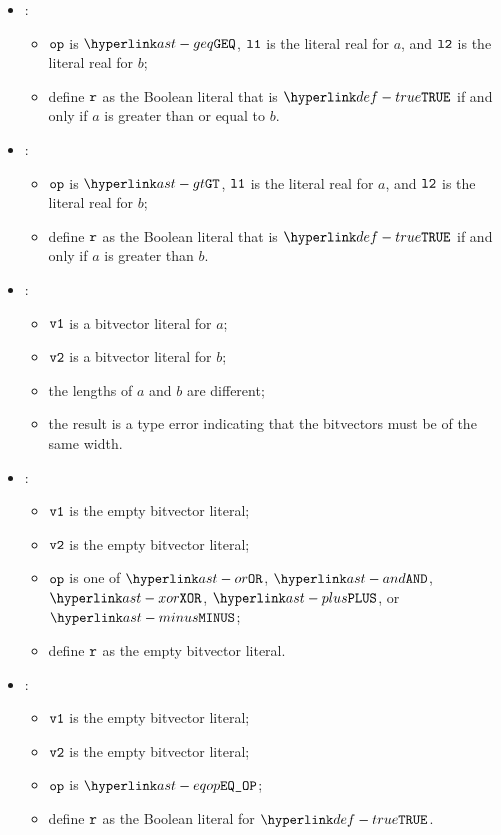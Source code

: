 \begin{itemize}
  \item {}:
  \begin{itemize}
    \item $\texttt{op}$ is $\GEQ$, $\texttt{l1}$ is the literal real for $a$, and $\texttt{l2}$ is the literal real for $b$;
    \item define $\texttt{r}$ as the Boolean literal that is $\True$ if and only if $a$ is greater than or equal to $b$.
  \end{itemize}

  \item {}:
  \begin{itemize}
    \item $\texttt{op}$ is $\GT$, $\texttt{l1}$ is the literal real for $a$, and $\texttt{l2}$ is the literal real for $b$;
    \item define $\texttt{r}$ as the Boolean literal that is $\True$ if and only if $a$ is greater than $b$.
  \end{itemize}

  \item {}:
  \begin{itemize}
    \item $\texttt{v1}$ is a bitvector literal for $a$;
    \item $\texttt{v2}$ is a bitvector literal for $b$;
    \item the lengths of $a$ and $b$ are different;
    \item the result is a type error indicating that the bitvectors must be of the same width.
  \end{itemize}

  \item {}:
  \begin{itemize}
    \item $\texttt{v1}$ is the empty bitvector literal;
    \item $\texttt{v2}$ is the empty bitvector literal;
    \item $\texttt{op}$ is one of $\OR$, $\AND$, $\XOR$, $\PLUS$, or $\MINUS$;
    \item define $\texttt{r}$ as the empty bitvector literal.
  \end{itemize}

  \item {}:
  \begin{itemize}
    \item $\texttt{v1}$ is the empty bitvector literal;
    \item $\texttt{v2}$ is the empty bitvector literal;
    \item $\texttt{op}$ is $\EQOP$;
    \item define $\texttt{r}$ as the Boolean literal for $\True$.
  \end{itemize}


\end{itemize}
